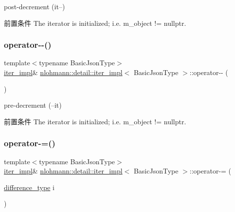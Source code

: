 post-\/decrement (it--) 

\begin{DoxyPrecond}{前置条件}
The iterator is initialized; i.\+e. {\ttfamily m\+\_\+object != nullptr}. 
\end{DoxyPrecond}
\mbox{\label{classnlohmann_1_1detail_1_1iter__impl_a84e689fb581d651d130039f7cb81494a}} 
\subsubsection{\texorpdfstring{operator-\/-\/()}{operator--()}\hspace{0.1cm}{\footnotesize\ttfamily [2/2]}}
{\footnotesize\ttfamily template$<$typename Basic\+Json\+Type$>$ \\
\mbox{\hyperlink{classnlohmann_1_1detail_1_1iter__impl}{iter\+\_\+impl}}\& \mbox{\hyperlink{classnlohmann_1_1detail_1_1iter__impl}{nlohmann\+::detail\+::iter\+\_\+impl}}$<$ Basic\+Json\+Type $>$\+::operator-\/-\/ (\begin{DoxyParamCaption}{ }\end{DoxyParamCaption})\hspace{0.3cm}{\ttfamily [inline]}}



pre-\/decrement (--it) 

\begin{DoxyPrecond}{前置条件}
The iterator is initialized; i.\+e. {\ttfamily m\+\_\+object != nullptr}. 
\end{DoxyPrecond}
\mbox{\label{classnlohmann_1_1detail_1_1iter__impl_abcc9d51bc52f2e8483bbe4018f05e978}} 
\subsubsection{\texorpdfstring{operator-\/=()}{operator-=()}}
{\footnotesize\ttfamily template$<$typename Basic\+Json\+Type$>$ \\
\mbox{\hyperlink{classnlohmann_1_1detail_1_1iter__impl}{iter\+\_\+impl}}\& \mbox{\hyperlink{classnlohmann_1_1detail_1_1iter__impl}{nlohmann\+::detail\+::iter\+\_\+impl}}$<$ Basic\+Json\+Type $>$\+::operator-\/= (\begin{DoxyParamCaption}\item[{\mbox{\hyperlink{classnlohmann_1_1detail_1_1iter__impl_a2f7ea9f7022850809c60fc3263775840}{difference\+\_\+type}}}]{i }\end{DoxyParamCaption})\hspace{0.3cm}{\ttfamily [inline]}}



